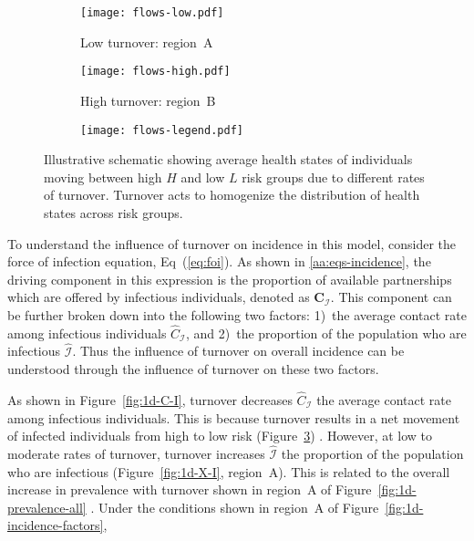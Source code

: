 \begin{figure}
  \centering
  \begin{subfigure}[t]{0.4\linewidth}
    \centering
    \texttt{[image: flows-low.pdf]}
    \caption{Low turnover: region~A}
    \label{fig:flows-low}
  \end{subfigure}%
  \begin{subfigure}[t]{0.4\linewidth}
    \centering
    \texttt{[image: flows-high.pdf]}
    \caption{High turnover: region~B}
    \label{fig:flows-high}
  \end{subfigure}%
  \begin{subfigure}[t]{0.2\linewidth}
    \centering
    \texttt{[image: flows-legend.pdf]}
  \end{subfigure}
  \caption{Illustrative schematic showing average health states of individuals
    moving between high $H$ and low $L$ risk groups due to different rates of turnover.
    Turnover acts to homogenize the distribution of health states across risk groups.}
  \label{fig:flows}
\end{figure}
\par
To understand the influence of turnover on incidence in this model,
consider the force of infection equation, Eq~(\ref{eq:foi}).
As shown in \ref{aa:eqs-incidence}, the driving component in this expression is
the proportion of available partnerships which are offered by infectious individuals,
denoted as $\bm{C}_{\mathcal{I}}$.
This component can be further broken down into the following two factors:
1)~the average contact rate among infectious individuals $\hat{C}_{\mathcal{I}}$, and
2)~the proportion of the population who are infectious $\hat{\mathcal{I}}$.
Thus the influence of turnover on overall incidence
can be understood through the influence of turnover on these two factors.
\par
As shown in Figure~\ref{fig:1d-C-I}, turnover decreases
$\hat{C}_{\mathcal{I}}$ the average contact rate among infectious individuals.
This is because turnover results in a net movement of infected individuals
from high to low risk (Figure~\ref{fig:flows}) \citep{Henry2015}.
However, at low to moderate rates of turnover, turnover increases
$\hat{\mathcal{I}}$ the proportion of the population who are infectious
(Figure~\ref{fig:1d-X-I}, region~A).
This is related to the overall increase in prevalence with turnover
shown in region~A of Figure~\ref{fig:1d-prevalence-all} \citep{Zhang2012}.
Under the conditions shown in region~A of Figure~\ref{fig:1d-incidence-factors},
